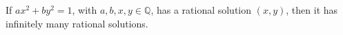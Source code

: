 If $ax^2 + by^2 = 1$, with $a, b, x, y \in \mathbb{Q}$, has a rational solution $(x, y)$, then it has infinitely many rational solutions.

